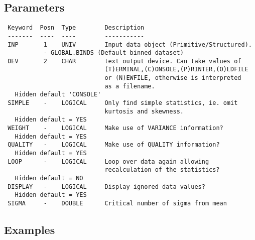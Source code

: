 \documentclass{book}
\renewcommand{\_}{{\tt\char'137}}     %
\begin{document}
\subsection{Parameters}
\begin{verbatim}
 Keyword  Posn  Type        Description
 -------  ----  ----        -----------
 INP       1    UNIV        Input data object (Primitive/Structured).
           - GLOBAL.BINDS (Default binned dataset)
 DEV       2    CHAR        text output device. Can take values of
                            (T)ERMINAL,(C)ONSOLE,(P)RINTER,(O)LDFILE
                            or (N)EWFILE, otherwise is interpreted
                            as a filename.
   Hidden default 'CONSOLE'
 SIMPLE    -    LOGICAL     Only find simple statistics, ie. omit
                            kurtosis and skewness.
   Hidden default = YES
 WEIGHT    -    LOGICAL     Make use of VARIANCE information?
   Hidden default = YES
 QUALITY   -    LOGICAL     Make use of QUALITY information?
   Hidden default = YES
 LOOP      -    LOGICAL     Loop over data again allowing
                            recalculation of the statistics?
   Hidden default = NO
 DISPLAY   -    LOGICAL     Display ignored data values?
   Hidden default = YES
 SIGMA     -    DOUBLE      Critical number of sigma from mean

\end{verbatim}\subsection{Examples}
\end{document}
